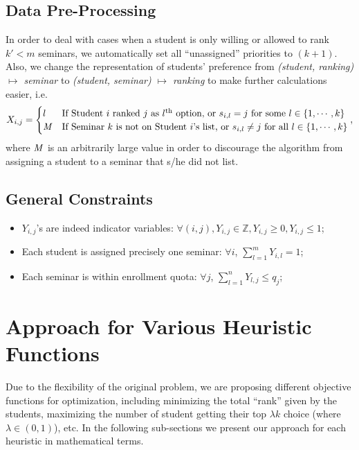 \documentclass{article} %
\begin{document}
\subsection{Data Pre-Processing}
    \par\qquad In order to deal with cases when a student is only willing or allowed to rank $k'<m$ seminars, we automatically set all ``unassigned'' priorities to $(k+1)$. Also, we change the representation of students' preference from \emph{(student, ranking) $\mapsto$ seminar} to \emph{(student, seminar) $\mapsto$ ranking} to make further calculations easier, i.e.
        $$X_{i,j}=\begin{cases}
                    l &\text{If Student $i$ ranked $j$ as $l^{\text{th}}$ option, or $s_{i,l}=j$ for some $l\in\{1,\cdots,k\}$}\\
                    {\bf\it M}     &\text{If Seminar $k$ is not on Student $i$'s list, or $s_{i,l} \neq j$ for all $l\in\{1,\cdots,k\}$}
                  \end{cases},$$
    where ${\bf\it M}$ is an arbitrarily large value in order to discourage the algorithm from assigning a student to a seminar that s/he did not list.

\subsection{General Constraints}
    \begin{itemize}
    \item $Y_{i,j}$'s are indeed indicator variables: $\forall (i,j), Y_{i,j}\in\mathbb{Z}, Y_{i,j}\geq 0, Y_{i,j}\leq 1$;
    \item Each student is assigned precisely one seminar: $\forall i$, $\sum_{l=1}^{m}{Y_{i,l}}=1$;
    \item Each seminar is within enrollment quota: $\forall j$, $\sum_{l=1}^{n}{Y_{l,j}} \leq q_j$;
\end{itemize}

%
%
\section{Approach for Various Heuristic Functions}
    \par\qquad Due to the flexibility of the original problem, we are proposing different objective functions for optimization, including minimizing the total ``rank'' given by the students, maximizing the number of student getting their top $\lambda k$ choice (where $\lambda\in(0,1)$), etc. In the following sub-sections we present our approach for each heuristic in mathematical terms.
\end{document}
